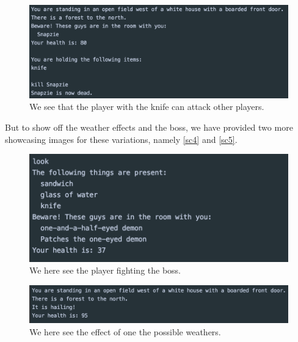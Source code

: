 \begin{figure}[H]
	\centering
	\includegraphics[width=0.8\linewidth]{Materials/Results/AttackingPlayer}
	\caption{We see that the player with the knife can attack other players.}
	\label{sc3}
\end{figure}

But to show off the weather effects and the boss, we have provided two more showcasing images for these variations, namely \autoref{sc4} and \autoref{sc5}.

\begin{figure}[H]
	\centering
	\includegraphics[width=0.7\linewidth]{Materials/Results/Boss}
	\caption{We here see the player fighting the boss.}
	\label{sc4}
\end{figure}

\begin{figure}[H]
	\centering
	\includegraphics[width=0.9\linewidth]{Materials/Results/Weather}
	\caption{We here see the effect of one the possible weathers.}
	\label{sc5}
\end{figure}

